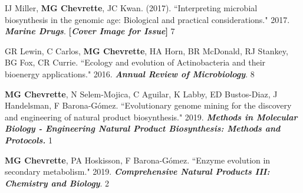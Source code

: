 \begin{cvpubs}
\cvpub
{IJ Miller, \textbf{MG Chevrette}, JC Kwan. (2017). ``Interpreting microbial biosynthesis in the genomic age: Biological and practical considerations." 2017. \textit{\textbf{Marine Drugs}}. \textbf{\textit{}} \linebreak \textbf{[\textit{Cover Image for Issue}]}}
{7}

\cvpub
{GR Lewin, C Carlos, \textbf{MG Chevrette}, HA Horn, BR McDonald, RJ Stankey, BG Fox, CR Currie. ``Ecology and evolution of Actinobacteria and their bioenergy applications." 2016. \textit{\textbf{Annual Review of Microbiology}}. \textbf{\textit{}}}
{8}

\end{cvpubs}



 \vspace{-2mm}

\begin{cvpubs}


\cvpub
{\textbf{MG Chevrette}, N Selem-Mojica, C Aguilar, K Labby, ED Bustos-Diaz, J Handelsman, F Barona-G\'{o}mez. ``Evolutionary genome mining for the discovery and engineering of natural product biosynthesis." 2019. \textit{\textbf{Methods in Molecular Biology - Engineering Natural Product Biosynthesis: Methods and Protocols.}} \textbf{\textit{}}}
{1}

\cvpub
{\textbf{MG Chevrette}, PA Hoskisson, F Barona-G\'{o}mez. ``Enzyme evolution in secondary metabolism." 2019. \textit{\textbf{Comprehensive Natural Products III: Chemistry and Biology}}. \textbf{\textit{}}}
{2}

\end{cvpubs}


 \vspace{-2mm}

